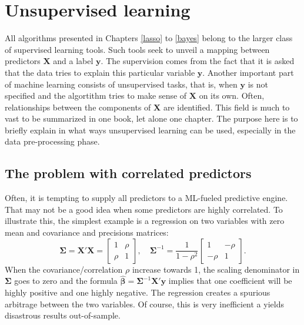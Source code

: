 \documentclass[]{krantz}
\theoremstyle{definition}
\theoremstyle{definition}
\theoremstyle{definition}
\theoremstyle{remark}
\begin{document}
\hypertarget{unsup}{%
\chapter{Unsupervised learning}\label{unsup}}

All algorithms presented in Chapters \ref{lasso} to \ref{bayes} belong
to the larger class of supervised learning tools. Such tools seek to
unveil a mapping between predictors \(\textbf{X}\) and a label
\(\textbf{y}\). The supervision comes from the fact that it is asked
that the data tries to explain this particular variable \(\textbf{y}\).
Another important part of machine learning consists of unsupervised
tasks, that is, when \(\textbf{y}\) is not specified and the algortithm
tries to make sense of \(\textbf{X}\) on its own. Often, relationships
between the components of \(\textbf{X}\) are identified. This field is
much to vast to be summarized in one book, let alone one chapter. The
purpose here is to briefly explain in what ways unsupervised learning
can be used, especially in the data pre-processing phase.

\hypertarget{corpred}{%
\section{The problem with correlated predictors}\label{corpred}}

Often, it is tempting to supply all predictors to a ML-fueled predictive
engine. That may not be a good idea when some predictors are highly
correlated. To illustrate this, the simplest example is a regression on
two variables with zero mean and covariance and precisions matrices:
\[\boldsymbol{\Sigma}=\textbf{X}'\textbf{X}=\begin{bmatrix} 1 & \rho \\ \rho & 1 \end{bmatrix},  \quad \boldsymbol{\Sigma}^{-1}=\frac{1}{1-\rho^2}\begin{bmatrix} 1 & -\rho \\ -\rho & 1 \end{bmatrix}.\]
When the covariance/correlation \(\rho\) increase towards 1, the scaling
denominator in \(\boldsymbol{\Sigma}\) goes to zero and the formula
\(\hat{\boldsymbol{\beta}}=\boldsymbol{\Sigma}^{-1}\textbf{X}'\textbf{y}\)
implies that one coefficient will be highly positive and one highly
negative. The regression creates a spurious arbitrage between the two
variables. Of course, this is very inefficient a yields disastrous
results out-of-sample.
\end{document}
